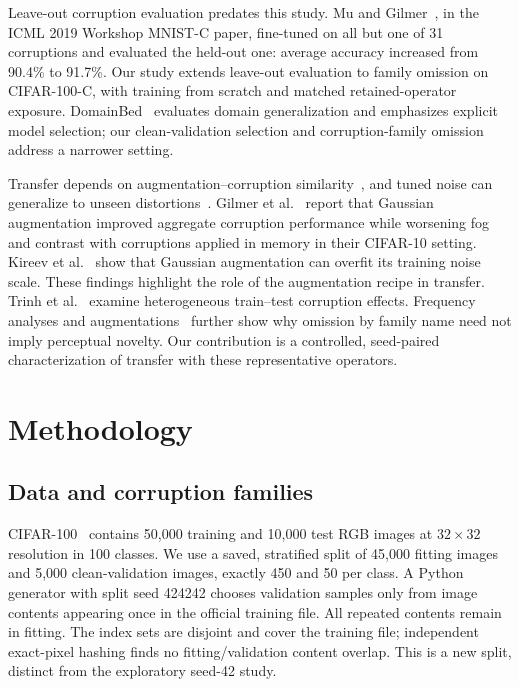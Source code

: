 \documentclass[twoside,a4paper,11pt]{article}
\begin{document}
Leave-out corruption evaluation predates this study. Mu and Gilmer~\cite{mu2019mnistc}, in the ICML 2019 Workshop MNIST-C paper, fine-tuned on all but one of 31 corruptions and evaluated the held-out one: average accuracy increased from 90.4\% to 91.7\%. Our study extends leave-out evaluation to family omission on CIFAR-100-C, with training from scratch and matched retained-operator exposure. DomainBed~\cite{gulrajani2021domainbed} evaluates domain generalization and emphasizes explicit model selection; our clean-validation selection and corruption-family omission address a narrower setting.

Transfer depends on augmentation--corruption similarity~\cite{geirhos2018generalisation,mintun2021interaction}, and tuned noise can generalize to unseen distortions~\cite{rusak2020simple}. Gilmer et al.~\cite{ford2019noise} report that Gaussian augmentation improved aggregate corruption performance while worsening fog and contrast with corruptions applied in memory in their CIFAR-10 setting. Kireev et al.~\cite{kireev2022adversarial} show that Gaussian augmentation can overfit its training noise scale. These findings highlight the role of the augmentation recipe in transfer. Trinh et al.~\cite{trinh2024damp} examine heterogeneous train--test corruption effects. Frequency analyses and augmentations~\cite{yin2019fourier,saikia2021frequency,vaish2024fourier} further show why omission by family name need not imply perceptual novelty. Our contribution is a controlled, seed-paired characterization of transfer with these representative operators.

\section{Methodology}
\subsection{Data and corruption families}
\label{sec:data}
CIFAR-100~\cite{krizhevsky2009tiny} contains 50,000 training and 10,000 test RGB images at $32\times32$ resolution in 100 classes. We use a saved, stratified split of 45,000 fitting images and 5,000 clean-validation images, exactly 450 and 50 per class. A Python generator with split seed 424242 chooses validation samples only from image contents appearing once in the official training file. All repeated contents remain in fitting. The index sets are disjoint and cover the training file; independent exact-pixel hashing finds no fitting/validation content overlap. This is a new split, distinct from the exploratory seed-42 study.
\end{document}

